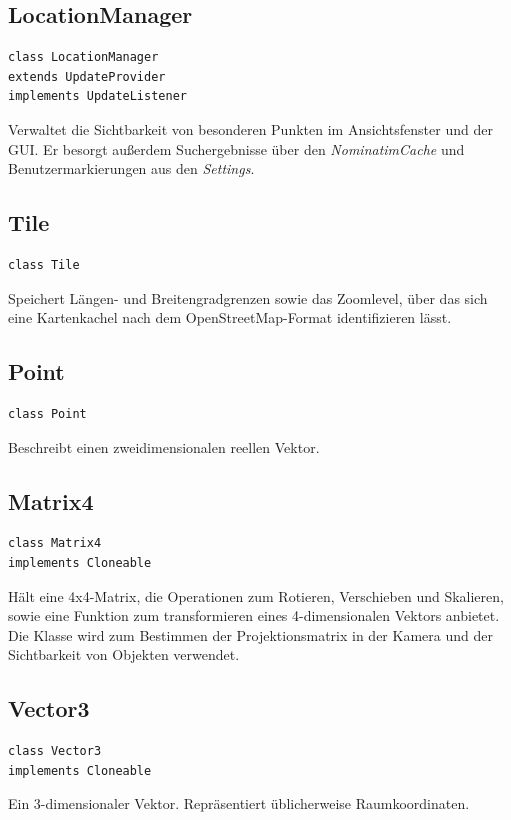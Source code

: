 \documentclass[10pt]{scrreprt}
\begin{document}
\subsection*{LocationManager}
\begin{lstlisting}
class LocationManager
extends UpdateProvider
implements UpdateListener
\end{lstlisting}
Verwaltet die Sichtbarkeit von besonderen Punkten im Ansichtsfenster und der GUI. Er besorgt außerdem Suchergebnisse über den \textit{NominatimCache} und Benutzermarkierungen aus den \textit{Settings}.\\



\subsection*{Tile}
\begin{lstlisting}
class Tile
\end{lstlisting}
Speichert Längen- und Breitengradgrenzen sowie das Zoomlevel, über das sich eine Kartenkachel nach dem OpenStreetMap-Format identifizieren lässt.\\


\subsection*{Point}
\begin{lstlisting}
class Point
\end{lstlisting}
Beschreibt einen zweidimensionalen reellen Vektor.\\


\subsection*{Matrix4}
\begin{lstlisting}
class Matrix4
implements Cloneable
\end{lstlisting}
Hält eine 4x4-Matrix, die Operationen zum Rotieren, Verschieben und Skalieren, sowie eine Funktion zum transformieren eines 4-dimensionalen Vektors anbietet. Die Klasse wird zum Bestimmen der Projektionsmatrix in der Kamera und der Sichtbarkeit von Objekten verwendet.\\



\subsection*{Vector3}
\begin{lstlisting}
class Vector3
implements Cloneable
\end{lstlisting}
Ein 3-dimensionaler Vektor. Repräsentiert üblicherweise Raumkoordinaten.\\
\end{document}

